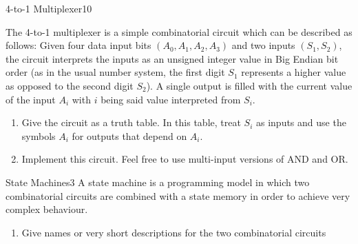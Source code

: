 \documentclass[twoside,a4paper]{article}
\begin{document}
\clearpage
\begin{task}{4-to-1 Multiplexer}{10}{}

  The 4-to-1 multiplexer is a simple combinatorial circuit which can be described as follows:
  Given four data input bits $(A_0,A_1,A_2,A_3)$ and two inputs $(S_1,S_2)$, the circuit interprets the inputs
  as an unsigned integer value in Big Endian bit order (as in the usual number system, the first digit $S_1$
  represents a higher value as opposed to the second digit $S_2$). A single output is filled with the current value
  of the input $A_i$ with $i$ being said value interpreted from $S_i$.

  \begin{enumerate}
  \item{
    Give the circuit as a truth table. In this table, treat $S_i$ as inputs and use the symbols $A_i$ for outputs that depend on $A_i$.
    \vspace*{6cm}}
  \item{Implement this circuit. Feel free to use multi-input versions of AND and OR.\clearpage }
    

    \end{enumerate}
\end{task}
\clearpage

\begin{task}{State Machines}{3}{}
  A state machine is a programming model in which two combinatorial circuits are combined with a state memory in
  order to achieve very complex behaviour.

  \begin{enumerate}
  \item{Give names or very short descriptions for the two combinatorial circuits\vspace{6cm}}
  \end{enumerate}
\end{task}
\end{document}
